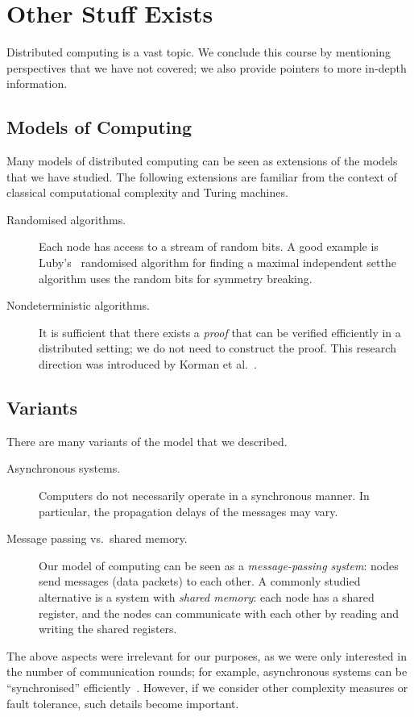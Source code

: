\section{Other Stuff Exists}\label{sec:other-stuff}

Distributed computing is a vast topic. We conclude this course by mentioning perspectives that we have not covered; we also provide pointers to more in-depth information.

\subsection{Models of Computing}

Many models of distributed computing can be seen as extensions of the models that we have studied. The following extensions are familiar from the context of classical computational complexity and Turing machines.
\begin{description}
    \item[Randomised algorithms.] Each node has access to a stream of random bits. A good example is Luby's~\cite{luby86simple} randomised algorithm for finding a maximal independent set\mydash the algorithm uses the random bits for symmetry breaking.
    \item[Nondeterministic algorithms.] It is sufficient that there exists a \emph{proof} that can be verified efficiently in a distributed setting; we do not need to construct the proof. This research direction was introduced by Korman et al.~\cite{korman05proof}.
\end{description}

\subsection{Variants}

There are many variants of the model that we described.
\begin{description}
    \item[Asynchronous systems.] Computers do not necessarily operate in a synchronous manner. In particular, the propagation delays of the messages may vary.
    \item[Message passing vs.\ shared memory.] Our model of computing can be seen as a \emph{message-passing system}: nodes send messages (data packets) to each other. A commonly studied alternative is a system with \emph{shared memory}: each node has a shared register, and the nodes can communicate with each other by reading and writing the shared registers.
\end{description}
The above aspects were irrelevant for our purposes, as we were only interested in the number of communication rounds; for example, asynchronous systems can be ``synchronised'' efficiently~\cite{awerbuch85complexity}. However, if we consider other complexity measures or fault tolerance, such details become important.

